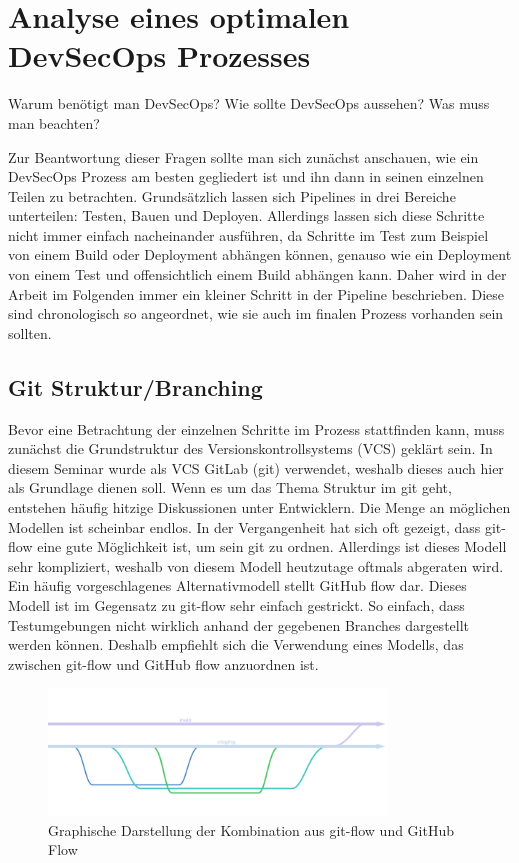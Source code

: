 \section{Analyse eines optimalen DevSecOps Prozesses}\label{sec:analysisDevSecOps}
Warum benötigt man DevSecOps?
Wie sollte DevSecOps aussehen?
Was muss man beachten?

Zur Beantwortung dieser Fragen sollte man sich zunächst anschauen, wie ein DevSecOps Prozess am besten gegliedert ist und ihn dann in seinen einzelnen Teilen zu betrachten.
Grundsätzlich lassen sich Pipelines in drei Bereiche unterteilen: Testen, Bauen und Deployen.
Allerdings lassen sich diese Schritte nicht immer einfach nacheinander ausführen, da Schritte im Test zum Beispiel von einem Build oder Deployment abhängen können, genauso wie ein Deployment von einem Test und offensichtlich einem Build abhängen kann.
Daher wird in der Arbeit im Folgenden immer ein kleiner Schritt in der Pipeline beschrieben.
Diese sind chronologisch so angeordnet, wie sie auch im finalen Prozess vorhanden sein sollten.

\subsection{Git Struktur/Branching}

Bevor eine Betrachtung der einzelnen Schritte im Prozess stattfinden kann, muss zunächst die Grundstruktur des Versionskontrollsystems (VCS) geklärt sein.
In diesem Seminar wurde als VCS GitLab (git) verwendet, weshalb dieses auch hier als Grundlage dienen soll.
Wenn es um das Thema Struktur im git geht, entstehen häufig hitzige Diskussionen unter Entwicklern.
Die Menge an möglichen Modellen ist scheinbar endlos.
In der Vergangenheit hat sich oft gezeigt, dass git-flow\cite{SuccessfulGitBranching} eine gute Möglichkeit ist, um sein git zu ordnen.
Allerdings ist dieses Modell sehr kompliziert, weshalb von diesem Modell heutzutage oftmals abgeraten wird.
Ein häufig vorgeschlagenes Alternativmodell stellt GitHub flow\cite{UnderstandingGitHubFlow} dar.
Dieses Modell ist im Gegensatz zu git-flow sehr einfach gestrickt.
So einfach, dass Testumgebungen nicht wirklich anhand der gegebenen Branches dargestellt werden können.
Deshalb empfiehlt sich die Verwendung eines Modells, das zwischen git-flow und GitHub flow anzuordnen ist.
\begin{figure}[H]
    \includegraphics[width=0.8\textwidth]{img/branching}
    \centering
    \caption{Graphische Darstellung der Kombination aus git-flow und GitHub Flow}
    \label{fig:branchingModel}
\end{figure}

